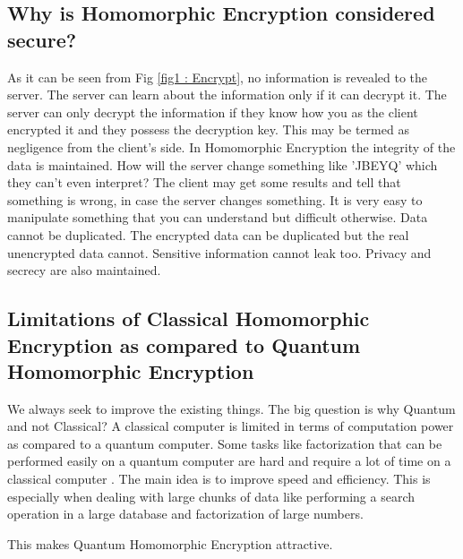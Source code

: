 \subsection{Why is Homomorphic Encryption considered secure?}
As it can be seen from Fig \ref{fig1 : Encrypt}, no information is revealed to the server. The server can learn about the information only if it can decrypt it. The server can only decrypt the information if they know how you as the client encrypted it and they possess the decryption key. This may be termed as negligence from the client's side. In Homomorphic Encryption the integrity of the data is maintained. How will the server change something like 'JBEYQ' which they can't even interpret? The client may get some results and tell that something is wrong, in case the server changes something. It is very easy to manipulate something that you can understand but difficult otherwise. Data cannot be duplicated. The encrypted data can be duplicated but the real unencrypted data cannot. Sensitive information cannot leak too. Privacy and secrecy are also maintained.

\subsection{Limitations of Classical Homomorphic Encryption as compared to Quantum Homomorphic Encryption}
We always seek to improve the existing things. The big question is why Quantum and not Classical?	A classical computer is limited in terms of computation power as compared to a quantum computer. Some tasks like factorization that can be performed easily on a quantum computer are hard and require a lot of time on a classical computer \citep{unruh1995maintaining}. The main idea is to improve speed and efficiency. This is especially when dealing with large chunks of data like performing a search operation in a large database and factorization of large numbers. 

This makes Quantum Homomorphic Encryption attractive. 

